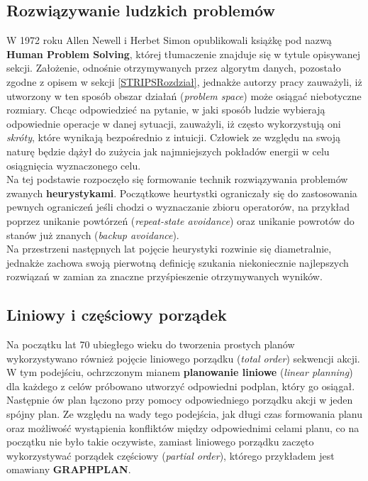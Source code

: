     \subsection{Rozwiązywanie ludzkich problemów}
    W 1972 roku Allen Newell i Herbet Simon opublikowali książkę pod nazwą \textbf{Human Problem Solving}, której tłumaczenie
    znajduje się w tytule opisywanej sekcji. Założenie, odnośnie otrzymywanych przez algorytm danych, 
    pozostało zgodne z opisem w sekcji \ref{STRIPSRozdział}, jednakże autorzy pracy zauważyli, iż utworzony w ten sposób 
    obszar działań (\textit{problem space}) może osiągać niebotyczne rozmiary. Chcąc odpowiedzieć na pytanie, 
    w jaki sposób ludzie wybierają odpowiednie operacje w danej sytuacji, zauważyli, iż często wykorzystują oni \textit{skróty},
    które wynikają bezpośrednio z intuicji. Człowiek ze względu na swoją naturę będzie dążył do zużycia jak najmniejszych 
    pokładów energii w celu osiągnięcia wyznaczonego celu. \\ 
    Na tej podstawie rozpoczęło się formowanie 
    technik rozwiązywania problemów zwanych \textbf{heurystykami}. Początkowe heurtystki ograniczały się do zastosowania 
    pewnych ograniczeń jeśli chodzi o wyznaczanie zbioru operatorów, na przykład poprzez unikanie powtórzeń (\textit{repeat-state avoidance})
    oraz unikanie powrotów do stanów już znanych (\textit{backup avoidance}). \\
    Na przestrzeni następnych lat pojęcie heurystyki rozwinie się diametralnie, jednakże
    zachowa swoją pierwotną definicję szukania niekoniecznie najlepszych rozwiązań w zamian za znaczne przyśpieszenie otrzymywanych wyników.

    \subsection{Liniowy i częściowy porządek}
    Na początku lat 70 ubiegłego wieku do tworzenia prostych planów wykorzystywano również pojęcie 
    liniowego porządku (\textit{total order}) sekwencji akcji. W tym podejściu, ochrzczonym mianem \textbf{planowanie liniowe}
    (\textit{linear planning}) dla każdego z celów  próbowano utworzyć odpowiedni podplan, który go osiągał.
    Następnie ów plan łączono przy pomocy odpowiedniego porządku akcji w jeden spójny plan.
    Ze względu na wady tego podejścia, jak długi czas formowania planu oraz możliwość wystąpienia konfliktów między 
    odpowiednimi celami planu, co na początku nie było takie oczywiste, zamiast liniowego porządku zaczęto wykorzystywać porządek częściowy (\textit{partial order}),
    którego przykładem jest omawiany \textbf{GRAPHPLAN}.


